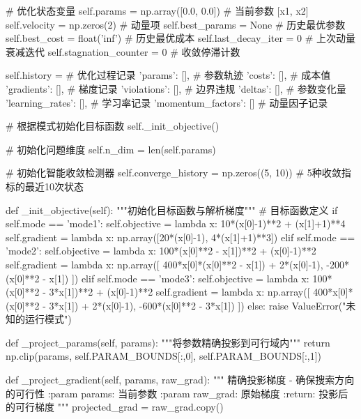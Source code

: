 \documentclass[a4paper,12pt]{article}
\begin{document}
\begin{python}
        # 优化状态变量
        self.params = np.array([0.0, 0.0])  # 当前参数 [x1, x2]
        self.velocity = np.zeros(2)         # 动量项
        self.best_params = None             # 历史最优参数
        self.best_cost = float('inf')       # 历史最优成本
        self.last_decay_iter = 0            # 上次动量衰减迭代
        self.stagnation_counter = 0         # 收敛停滞计数
        
        self.history = {                    # 优化过程记录
            'params': [],                   # 参数轨迹
            'costs': [],                    # 成本值
            'gradients': [],                # 梯度记录
            'violations': [],               # 边界违规
            'deltas': [],                   # 参数变化量
            'learning_rates': [],           # 学习率记录
            'momentum_factors': []          # 动量因子记录
        }

        # 根据模式初始化目标函数
        self._init_objective()
        
        # 初始化问题维度
        self.n_dim = len(self.params)
        
        # 初始化智能收敛检测器
        self.converge_history = np.zeros((5, 10))  # 5种收敛指标的最近10次状态

    def _init_objective(self):
        """初始化目标函数与解析梯度"""
        # 目标函数定义
        if self.mode == 'mode1':
            self.objective = lambda x: 10*(x[0]-1)**2 + (x[1]+1)**4
            self.gradient = lambda x: np.array([20*(x[0]-1), 4*(x[1]+1)**3])
        elif self.mode == 'mode2':
            self.objective = lambda x: 100*(x[0]**2 - x[1])**2 + (x[0]-1)**2
            self.gradient = lambda x: np.array([
                400*x[0]*(x[0]**2 - x[1]) + 2*(x[0]-1),
                -200*(x[0]**2 - x[1])
            ])
        elif self.mode == 'mode3':
            self.objective = lambda x: 100*(x[0]**2 - 3*x[1])**2 + (x[0]-1)**2
            self.gradient = lambda x: np.array([
                400*x[0]*(x[0]**2 - 3*x[1]) + 2*(x[0]-1),
                -600*(x[0]**2 - 3*x[1])
            ])
        else:
            raise ValueError("未知的运行模式")

    def _project_params(self, params):
        """将参数精确投影到可行域内"""
        return np.clip(params, self.PARAM_BOUNDS[:,0], self.PARAM_BOUNDS[:,1])

    def _project_gradient(self, params, raw_grad):
        """
        精确投影梯度 - 确保搜索方向的可行性
        :param params: 当前参数
        :param raw_grad: 原始梯度
        :return: 投影后的可行梯度
        """
        projected_grad = raw_grad.copy()
        

\end{python}
\end{document}
